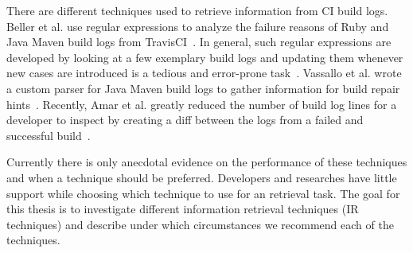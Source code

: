 \documentclass[\myrootdir/main.tex]{subfiles}
\begin{document}
There are different techniques used to retrieve information from CI build logs. Beller et al. use regular expressions to analyze the failure reasons of Ruby and Java Maven build logs from TravisCI~\cite{beller2017oops}.
In general, such regular expressions are developed by looking at a few exemplary build logs and updating them whenever new cases are introduced is a tedious and error-prone task~\cite{michael2019regexes}.
Vassallo et al. wrote a custom parser for Java Maven build logs to gather information for build repair hints~\cite{vassallo2018un-break}.
Recently, Amar et al. greatly reduced the number of build log lines for a developer to inspect by creating a diff between the logs from a failed and successful build~\cite{amar2019mining}.

Currently there is only anecdotal evidence on the performance of these techniques and when a technique should be preferred.
Developers and researches have little support while choosing which technique to use for an retrieval task.
The goal for this thesis is to investigate different information retrieval techniques (IR techniques) and describe under which circumstances we recommend each of the techniques.
\end{document}
